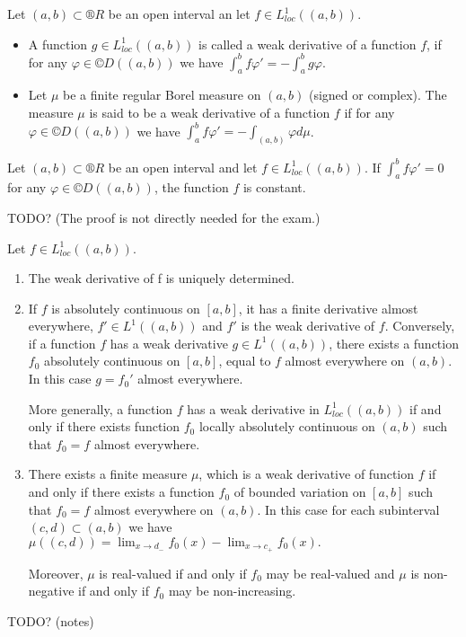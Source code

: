 \documentclass[12pt]{article}					%
\begin{document}
\begin{definice}
	Let $(a, b) \subset ®R$ be an open interval an let $f \in L^1_{loc}((a, b))$.
	\begin{itemize}
		\item A function $g \in L^1_{loc}((a, b))$ is called a weak derivative of a function $f$, if for any $φ \in ©D((a, b))$ we have $\int_a^b f φ' = -\int_a^b g φ$.
		\item Let $μ$ be a finite regular Borel measure on $(a, b)$ (signed or complex). The measure $μ$ is said to be a weak derivative of a function $f$ if for any $φ \in ©D((a, b))$ we have $\int_a^b f φ' = - \int_{(a, b)} φ dμ$.
	\end{itemize}
\end{definice}

\begin{tvrzeni}
	Let $(a, b) \subset ®R$ be an open interval and let $f \in L^1_{loc}((a, b))$. If $\int_a^b f φ' = 0$ for any $φ \in ©D((a, b))$, the function $f$ is constant.

	\begin{dukazin}
		TODO? (The proof is not directly needed for the exam.)
	\end{dukazin}
\end{tvrzeni}

\begin{veta}
	Let $f \in L^1_{loc}((a, b))$.

	\begin{enumerate}
		\item The weak derivative of f is uniquely determined.
		\item If $f$ is absolutely continuous on $[a, b]$, it has a finite derivative almost everywhere, $f' \in L^1((a, b))$ and $f'$ is the weak derivative of $f$. Conversely, if a function $f$ has a weak derivative $g \in L^1((a, b))$, there exists a function $f_0$ absolutely continuous on $[a, b]$, equal to $f$ almost everywhere on $(a, b)$. In this case $g = f_0'$ almost everywhere.

			More generally, a function $f$ has a weak derivative in $L^1_{loc}((a, b))$ if and only if there exists function $f_0$ locally absolutely continuous on $(a, b)$ such that $f_0 = f$ almost everywhere.
		\item There exists a finite measure $μ$, which is a weak derivative of function $f$ if and only if there exists a function $f_0$ of bounded variation on $[a, b]$ such that $f_0 = f$ almost everywhere on $(a, b)$. In this case for each subinterval $(c, d) \subset (a, b)$ we have $μ((c, d)) = \lim_{x \rightarrow d_-} f_0(x) - \lim_{x \rightarrow c_+} f_0(x).$

			Moreover, $μ$ is real-valued if and only if $f_0$ may be real-valued and $μ$ is non-negative if and only if $f_0$ may be non-increasing.
	\end{enumerate}

	\begin{dukazin}[1. and 2.]
		TODO? (notes)
	\end{dukazin}
\end{veta}
\end{document}
